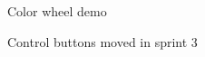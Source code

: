 \documentclass[11pt]{article} %
\begin{document}
  \begin{figure}[H]
  	\centering
  	\caption{Color wheel demo}
  	\label{fig:GUI Design 3 demo}
  \end{figure}
  
  \begin{figure}[H]
  	\centering
  	\caption{Control buttons moved in sprint 3}
  	\label{fig:GUI Design 4}
  \end{figure}
  
\end{document}
